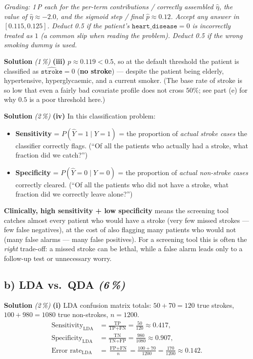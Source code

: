 \documentclass[11pt,a4paper]{article}
\newcommand{\subpoints}[1]{\textit{(#1\,\%)}}
\newcommand{\sol}{\noindent\textbf{Solution}}
\begin{document}
\noindent\emph{Grading: 1\,P each for the per-term contributions / correctly assembled $\hat\eta$,
the value of $\hat\eta\approx -2.0$, and the sigmoid step / final $\hat p\approx 0.12$. Accept any
answer in $[0.115, 0.125]$. Deduct 0.5 if the patient's $\texttt{heart\_disease}=0$ is incorrectly
treated as $1$ (a common slip when reading the problem). Deduct 0.5 if the wrong smoking dummy is
used.}

\medskip
\sol{} \subpoints{1} \textbf{(iii)} $\hat p \approx 0.119 < 0.5$, so at the default threshold the
patient is classified as $\widehat{\texttt{stroke}}=0$ (\textbf{no stroke}) --- despite the
patient being elderly, hypertensive, hyperglycaemic, and a current smoker. (The base rate of
stroke is so low that even a fairly bad covariate profile does not cross $50\%$; see part (e)
for why $0.5$ is a poor threshold here.)

\medskip
\sol{} \subpoints{2} \textbf{(iv)} In this classification problem:
\begin{itemize}
  \item \textbf{Sensitivity} = $P(\hat Y = 1 \mid Y = 1)$ = the proportion of \emph{actual
        stroke cases} the classifier correctly flags. (``Of all the patients who actually had a
        stroke, what fraction did we catch?'')
  \item \textbf{Specificity} = $P(\hat Y = 0 \mid Y = 0)$ = the proportion of \emph{actual
        non-stroke cases} correctly cleared. (``Of all the patients who did not have a stroke,
        what fraction did we correctly leave alone?'')
\end{itemize}
\textbf{Clinically, high sensitivity + low specificity} means the screening tool catches almost
every patient who would have a stroke (very few missed strokes --- few false negatives), at the
cost of also flagging many patients who would not (many false alarms --- many false positives).
For a screening tool this is often the \emph{right} trade-off: a missed stroke can be lethal,
while a false alarm leads only to a follow-up test or unnecessary worry.

\subsection*{b) LDA vs.\ QDA \subpoints{6}}

\sol{} \subpoints{2} \textbf{(i)} LDA confusion matrix totals: $50+70=120$ true strokes,
$100+980=1080$ true non-strokes, $n=1200$.
\begin{align*}
\text{Sensitivity}_{\mathrm{LDA}} &= \frac{\text{TP}}{\text{TP}+\text{FN}}
   = \frac{50}{120} \approx \boxed{0.417}, \\
\text{Specificity}_{\mathrm{LDA}} &= \frac{\text{TN}}{\text{TN}+\text{FP}}
   = \frac{980}{1080} \approx \boxed{0.907}, \\
\text{Error rate}_{\mathrm{LDA}} &= \frac{\text{FP}+\text{FN}}{n}
   = \frac{100+70}{1200} = \frac{170}{1200} \approx \boxed{0.142}.
\end{align*}
\end{document}
